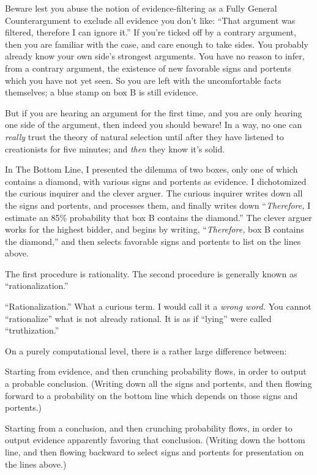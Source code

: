 {
 Beware lest you abuse the notion of evidence-filtering as a Fully
General Counterargument to exclude all evidence you
don't like: ``That argument was
filtered, therefore I can ignore it.'' If
you're ticked off by a contrary argument, then you are
familiar with the case, and care enough to take sides. You probably
already know your own side's strongest arguments. You
have no reason to infer, from a contrary argument, the existence of new
favorable signs and portents which you have not yet seen. So you are
left with the uncomfortable facts themselves; a blue stamp on box B is
still evidence.}

{
 But if you are hearing an argument for the first time, and you are
only hearing one side of the argument, then indeed you should beware!
In a way, no one can \textit{really} trust the theory of natural
selection until after they have listened to creationists for five
minutes; and \textit{then} they know it's solid.}

\myendsectiontext


{
 In The Bottom Line, I presented the dilemma of two boxes, only one
of which contains a diamond, with various signs and portents as
evidence. I dichotomized the curious inquirer and the clever arguer.
The curious inquirer writes down all the signs and portents, and
processes them, and finally writes down
``\textit{Therefore,} I estimate an 85\% probability
that box B contains the diamond.'' The clever arguer
works for the highest bidder, and begins by writing,
``\textit{Therefore,} box B contains the
diamond,'' and then selects favorable signs and
portents to list on the lines above. }

{
 The first procedure is rationality. The second procedure is
generally known as
``rationalization.''}

{
 ``Rationalization.'' What a
curious term. I would call it a \textit{wrong word.} You cannot
``rationalize'' what is not already
rational. It is as if ``lying'' were
called ``truthization.''}

{
 On a purely computational level, there is a rather large
difference between:}

{
 Starting from evidence, and then crunching probability flows, in
order to output a probable conclusion. (Writing down all the signs and
portents, and then flowing forward to a probability on the bottom line
which depends on those signs and portents.)}

{
 Starting from a conclusion, and then crunching probability flows,
in order to output evidence apparently favoring that conclusion.
(Writing down the bottom line, and then flowing backward to select
signs and portents for presentation on the lines above.)}

